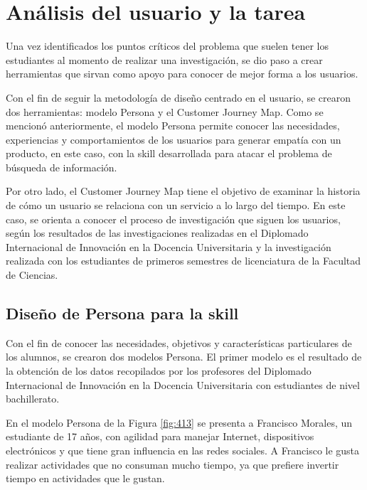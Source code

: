 
\section{Análisis del usuario y la tarea}
\label{AnalisisUsuariocapIV}

Una vez identificados los puntos críticos del problema que suelen tener los estudiantes al momento de realizar una investigación, se dio paso a crear herramientas que sirvan como apoyo para conocer de mejor forma a los usuarios.

Con el fin de seguir la metodología de diseño centrado en el usuario, se crearon dos herramientas: modelo Persona y el Customer Journey Map. Como se mencionó anteriormente, el modelo Persona permite conocer las necesidades, experiencias y comportamientos de los usuarios para generar empatía con un producto, en este caso, con la skill desarrollada para atacar el problema de búsqueda de información.

Por otro lado, el Customer Journey Map tiene el objetivo de examinar la historia de cómo un usuario se relaciona con un servicio a lo largo del tiempo. En este caso, se orienta a conocer el proceso de investigación que siguen los usuarios, según los resultados de las investigaciones realizadas en el Diplomado Internacional de Innovación en la Docencia Universitaria y la investigación realizada con los estudiantes de primeros semestres de licenciatura de la Facultad de Ciencias.


\subsection{Diseño de Persona para la skill}
\label{DisenioPersonacapIV}

Con el fin de conocer las necesidades, objetivos y características particulares de los alumnos, se crearon dos modelos Persona. El primer modelo es el resultado de la obtención de los datos recopilados por los profesores del Diplomado Internacional de Innovación en la Docencia Universitaria con estudiantes de nivel bachillerato.

En el modelo Persona de la Figura \ref{fig:413} se presenta a Francisco Morales, un estudiante de 17 años, con agilidad para manejar Internet, dispositivos electrónicos y que tiene gran influencia en las redes sociales. A Francisco le gusta realizar actividades que no consuman mucho tiempo, ya que prefiere invertir tiempo en actividades que le gustan.

